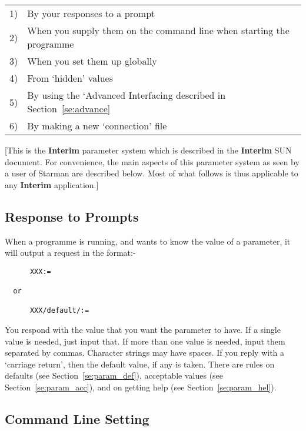 \begin{tabular}{ll}
\hspace{4ex} 1) & By your responses to a prompt \\
\hspace{4ex} 2) & When you supply them on the command line when starting the programme \\
\hspace{4ex} 3) & When you set them up globally \\
\hspace{4ex} 4) & From `hidden' values \\
\hspace{4ex} 5) & By using the `Advanced Interfacing described in Section~\ref{se:advance} \\
\hspace{4ex} 6) & By making a new `connection' file \\
\end{tabular}


[This is the {\bf Interim} parameter system which is described in the
{\bf Interim} SUN document. For convenience, the main aspects of this
parameter system as seen by a user of Starman are described below. Most of
what follows is thus applicable to any {\bf Interim} application.] 

\subsection{Response to Prompts}

When a programme is running, and wants to know the value of a parameter, it
will output a request in the format:-
\begin{verbatim}
      XXX:=

  or
  
      XXX/default/:=
\end{verbatim}

You respond with the value that you want the parameter to have. If a single
value is needed, just input that. If more than one value is needed, input
them separated by commas. Character strings may have spaces. If you reply
with a `carriage return', then the default value, if any is taken. There
are rules on defaults (see Section~\ref{se:param_def}), acceptable values
(see Section~\ref{se:param_acc}), and on getting help (see
Section~\ref{se:param_hel}). 

\subsection{Command Line Setting}

